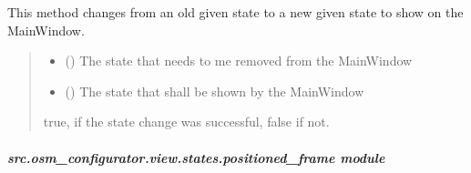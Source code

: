\documentclass[letterpaper,10pt,english]{sphinxmanual}
\begin{document}
\begin{fulllineitems}
\begin{fulllineitems}
\label{\detokenize{apidoc/src.osm_configurator.view.states:src.osm_configurator.view.states.main_window.MainWindow.change_state}}
\pysigstartsignatures
{}
\pysigstopsignatures
\sphinxAtStartPar
This method changes from an old given state to a new given state to show on the MainWindow.
\begin{quote}\begin{description}
\begin{itemize}
\item {} 
\sphinxAtStartPar
{} ({\hyperref[\detokenize{apidoc/src.osm_configurator.view.states:src.osm_configurator.view.states.state.State}]{}}) \textendash{} The state that needs to me removed from the MainWindow

\item {} 
\sphinxAtStartPar
{} ({\hyperref[\detokenize{apidoc/src.osm_configurator.view.states:src.osm_configurator.view.states.state.State}]{}}) \textendash{} The state that shall be shown by the MainWindow

\end{itemize}

\sphinxAtStartPar
true, if the state change was successful, false if not.

\sphinxAtStartPar
{}

\end{description}\end{quote}

\end{fulllineitems}


\end{fulllineitems}



\subparagraph{src.osm\_configurator.view.states.positioned\_frame module}
\label{\detokenize{apidoc/src.osm_configurator.view.states:module-src.osm_configurator.view.states.positioned_frame}}\label{\detokenize{apidoc/src.osm_configurator.view.states:src-osm-configurator-view-states-positioned-frame-module}}
\end{document}
